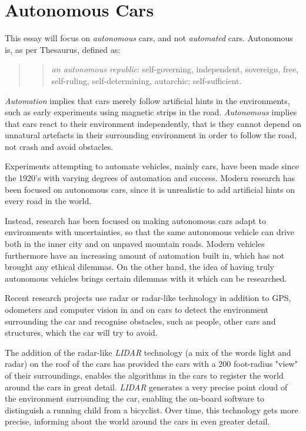 \chapter{Autonomous Cars}

This essay will focus on \textit{autonomous} cars, and not \textit{automated} cars. Autonomous is, as per Thesaurus, defined as: 

\begin{quote}
	\blockquote{\textit{an autonomous republic}: self-governing, independent, sovereign, free, self-ruling, self-determining, autarchic; self-sufficient.}
\end{quote}

\noindent \textit{Automation} implies that cars merely follow artificial hints in the environments, such as early experiments using magnetic strips in the road. \cite{wiki:autonomoushistory}
\textit{Autonomous} implies that cars react to their environment independently, that is they cannot depend on unnatural artefacts in their surrounding environment in order to follow the road, not crash and avoid obstacles.

\newpar Experiments attempting to automate vehicles, mainly cars, have been made since the 1920's with varying degrees of automation and success. Modern research has been focused on autonomous cars, since it is unrealistic to add artificial hints on every road in the world. 

Instead, research has been focused on making autonomous cars adapt to environments with uncertainties, so that the same autonomous vehicle can drive both in the inner city and on unpaved mountain roads. Modern vehicles furthermore have an increasing amount of automation built in, which has not brought any ethical dilemmas. On the other hand, the idea of having truly autonomous vehicles brings certain dilemmas with it which can be researched.

\newpar Recent research projects use radar or radar-like technology in addition to GPS, odometers and computer vision in and on cars to detect the environment surrounding the car and recognise obstacles, such as people, other cars and structures, which the car will try to avoid. 

The addition of the radar-like \textit{LIDAR} technology (a mix of the words light and radar) on the roof of the cars has provided the cars with a 200 foot-radius "view" of their surroundings, enables the algorithms in the cars to register the world around the cars in great detail. \textit{LIDAR} generates a very precise point cloud of the environment surrounding the car, enabling the on-board software to distinguish a running child from a bicyclist. Over time, this technology gets more precise, informing about the world around the cars in even greater detail.

